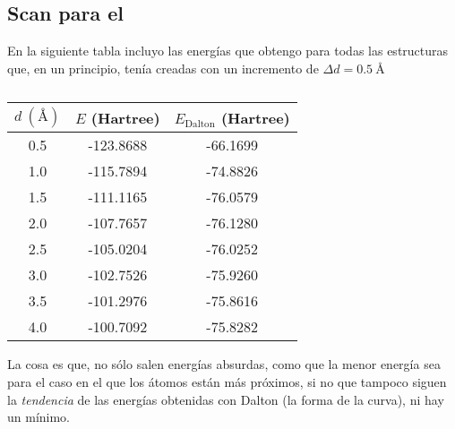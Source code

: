 \subsection{Scan para el }
En la siguiente tabla incluyo las energías que obtengo para todas las estructuras
que, en un principio, tenía creadas con un incremento de $\Delta d = 0.5\ \text{\AA}$
\begin{table}[b]
    \caption{}
    \centering
    \begin{tabular}{@{}c c c@{}}
        \toprule
        $d\ \left( \text{\AA} \right)$ & $E$ (Hartree) & $E_{\text{Dalton}}$ (Hartree)\\
        \midrule
        0.5 &  -123.8688 &  -66.1699 \\
        1.0 &  -115.7894 &  -74.8826 \\
        1.5 &  -111.1165 &  -76.0579 \\
        2.0 &  -107.7657 &  -76.1280 \\
        2.5 &  -105.0204 &  -76.0252 \\
        3.0 &  -102.7526 &  -75.9260 \\
        3.5 &  -101.2976 &  -75.8616 \\
        4.0 &  -100.7092 &  -75.8282 \\
        \bottomrule
    \end{tabular}
\end{table}

La cosa es que, no sólo salen energías absurdas, como que la menor energía sea
para el caso en el que los átomos están más próximos, si no que tampoco siguen la
\textit{tendencia} de las energías obtenidas con Dalton (la forma de la curva),
ni hay un mínimo.
